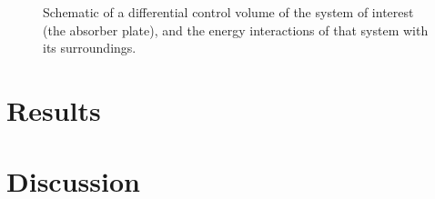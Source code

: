 \documentclass[]{report}
\begin{document}
\begin{figure}[h]
	\centering
	\caption{Schematic of a differential control volume of the system of interest (the absorber plate), and the energy interactions of that system with its surroundings.}
	\label{fig:model_schematic}
\end{figure}

\section{Results}

\section{Discussion}
\end{document}

